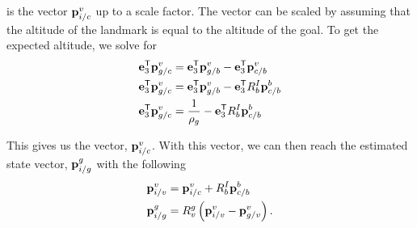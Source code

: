   is the vector $\boldsymbol{\mathrm{p}}_{i/c}^v$ up to a scale factor. The vector can be scaled by assuming that the altitude of the landmark is equal to the
altitude of the goal. To get the expected altitude, we solve for
\begin{align}
  \boldsymbol{\mathrm{e}}_3^{\mathsf{T}} \boldsymbol{\mathrm{p}}_{g/c}^v &= \boldsymbol{\mathrm{e}}_3^{\mathsf{T}} \boldsymbol{\mathrm{p}}_{g/b}^v - \boldsymbol{\mathrm{e}}_3^{\mathsf{T}} \boldsymbol{\mathrm{p}}_{c/b}^v \\
  \boldsymbol{\mathrm{e}}_3^{\mathsf{T}} \boldsymbol{\mathrm{p}}_{g/c}^v &= \boldsymbol{\mathrm{e}}_3^{\mathsf{T}} \boldsymbol{\mathrm{p}}_{g/b}^v -
  \boldsymbol{\mathrm{e}}_3^{\mathsf{T}} R_b^I \boldsymbol{\mathrm{p}}_{c/b}^b \\
  \boldsymbol{\mathrm{e}}_3^{\mathsf{T}} \boldsymbol{\mathrm{p}}_{g/c}^v &= \frac{1}{\rho_g} -
  \boldsymbol{\mathrm{e}}_3^{\mathsf{T}} R_b^I \boldsymbol{\mathrm{p}}_{c/b}^b \\
\end{align}

This gives us the vector, $\boldsymbol{\mathrm{p}}_{i/c}^v$.
With this vector, we can then reach the estimated state vector,
$\boldsymbol{\mathrm{p}}_{i/g}^g$ with the following
\begin{align}
  \boldsymbol{\mathrm{p}}_{i/v}^v &= \boldsymbol{\mathrm{p}}_{i/c}^v + R_b^I \boldsymbol{\mathrm{p}}_{c/b}^b \\
  \boldsymbol{\mathrm{p}}_{i/g}^g &= R_v^g \left( \boldsymbol{\mathrm{p}}_{i/v}^v - \boldsymbol{\mathrm{p}}_{g/v}^v \right).
\end{align}

